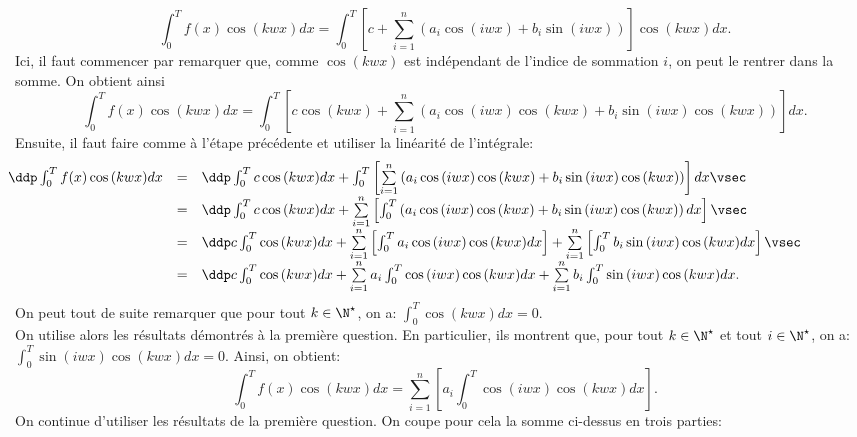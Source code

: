 \documentclass[a4paper, 11pt,reqno]{article}
\begin{document}
\begin{correction}
\begin{enumerate}
\begin{itemize}
			            $$\int_0^T f(x)\cos{(kwx)}dx= \int_0^T \left\lbrack c+\sum\limits_{i=1}^n \left( a_i\cos{(iwx)} + b_i\sin{(iwx)}  \right)    \right\rbrack    \cos{(kwx)}dx.$$
			            Ici, il faut commencer par remarquer que, comme $\cos{(kwx)}$ est ind\'ependant de l'indice de sommation $i$, on peut le rentrer dans la somme. On obtient ainsi
			            $$\int_0^T f(x)\cos{(kwx)}dx= \int_0^T \left\lbrack c \cos{(kwx)}+\sum\limits_{i=1}^n \left( a_i\cos{(iwx)} \cos{(kwx)} + b_i\sin{(iwx)} \cos{(kwx)}  \right)    \right\rbrack dx.$$
			            Ensuite, il faut faire comme \`a l'\'etape pr\'ec\'edente et utiliser la lin\'earit\'e de l'int\'egrale:
			            $$\hspace*{-2cm}\begin{array}{lll}
					            \ddp \int_0^T f(x)\cos{(kwx)}dx & = & \ddp \int_0^T c\cos{(kwx)}dx + \int_0^T \left\lbrack \sum\limits_{i=1}^n \left( a_i\cos{(iwx)} \cos{(kwx)} + b_i\sin{(iwx)} \cos{(kwx)}  \right)\right\rbrack dx\vsec                                         \\
					                                            & = & \ddp \int_0^T c\cos{(kwx)}dx + \sum\limits_{i=1}^n \left\lbrack \int_0^T \left( a_i\cos{(iwx)} \cos{(kwx)} + b_i\sin{(iwx)} \cos{(kwx)}  \right) dx\right\rbrack\vsec                                         \\
					                                            & = & \ddp c\int_0^T \cos{(kwx)}dx + \sum\limits_{i=1}^n \left\lbrack\int_0^T a_i\cos{(iwx)} \cos{(kwx)} dx\right\rbrack + \sum\limits_{i=1}^n \left\lbrack\int_0^T b_i\sin{(iwx)} \cos{(kwx)} dx\right\rbrack\vsec \\
					                                            & = & \ddp c\int_0^T \cos{(kwx)}dx + \sum\limits_{i=1}^n a_i \int_0^T \cos{(iwx)} \cos{(kwx)} dx + \sum\limits_{i=1}^n b_i \int_0^T \sin{(iwx)} \cos{(kwx)} dx.
				            \end{array}$$
			            On peut tout de suite remarquer que pour tout $k\in\N^{\star}$, on a: $\int_0^T \cos{(kwx)}dx=0$.\\
			            \noindent On utilise alors les r\'esultats d\'emontr\'es \`a la premi\`ere question. En particulier, ils montrent que, pour tout $k\in\N^{\star}$ et tout $i\in\N^{\star}$, on a: $\int_0^T \sin{(iwx)} \cos{(kwx)} dx =0$. Ainsi, on obtient:
			            $$ \int_0^T f(x)\cos{(kwx)}dx = \sum\limits_{i=1}^n \left\lbrack a_i \int_0^T \cos{(iwx)} \cos{(kwx)} dx\right\rbrack .$$
			            On continue d'utiliser les r\'esultats de la premi\`ere question. On coupe pour cela la somme ci-dessus en trois parties:

\end{itemize}
\end{enumerate}
\end{correction}
\end{document}
